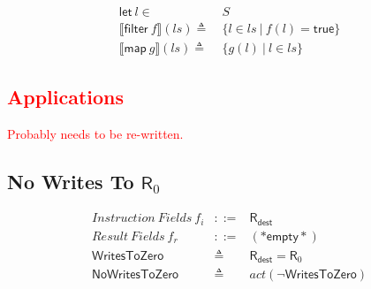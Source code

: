 \documentclass[12pt, letterpaper]{article}
\newcommand\interp[1]{\llbracket #1 \rrbracket}
\begin{document}
    \begin{align*}
        \mathsf{let}\ l \in\ & S\\
        \interp{\mathsf{filter}\ f}(ls)
            \triangleq\ & \{l \in ls\ |\ f(l) = \mathsf{true}\}\\
        \interp{\mathsf{map}\ g}(ls)
            \triangleq\ &
            \{ g(l)\ |\ l\in ls \} 
    \end{align*}

\textcolor{red}{\section{Applications}
Probably needs to be re-written.}

\subsection{No Writes To $\mathsf{R}_0$}

 \[
 \begin{array}{rcl}
   \mathit{Instruction\ Fields}\ f_i &::=& \mathsf{R}_{\mathsf{dest}} \\
   \mathit{Result\ Fields}\ f_r &::=& \mathsf{(*empty*)}\\
   \mathsf{WritesToZero} &\triangleq& \mathsf{R}_{\mathsf{dest}} = \mathsf{R}_0 \\
   \mathsf{NoWritesToZero} &\triangleq& \mathit{act}(\neg\mathsf{WritesToZero})
 \end{array}
 \]%
 
\end{document}
